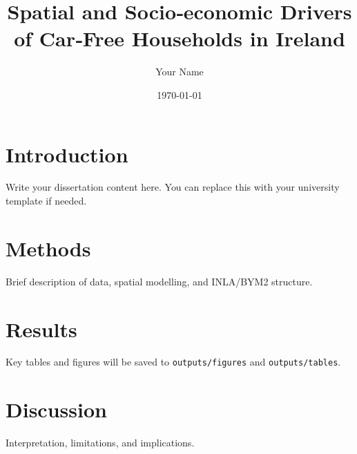 \documentclass[12pt]{article}
\title{Spatial and Socio‑economic Drivers of Car‑Free Households in Ireland}
\author{Your Name}
\date{\today}
\begin{document}
\maketitle

\section{Introduction}
Write your dissertation content here. You can replace this with your university template if needed.

\section{Methods}
Brief description of data, spatial modelling, and INLA/BYM2 structure.

\section{Results}
Key tables and figures will be saved to \texttt{outputs/figures} and \texttt{outputs/tables}.

\section{Discussion}
Interpretation, limitations, and implications.



\end{document}
